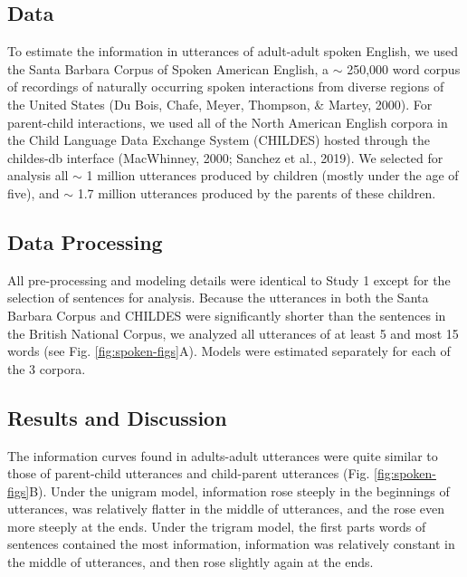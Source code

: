 \documentclass[man,floatsintext]{apa6}
\begin{document}
\hypertarget{data-1}{%
\subsection{Data}\label{data-1}}

To estimate the information in utterances of adult-adult spoken English, we used the Santa Barbara Corpus of Spoken American English, a \(\sim\) 250,000 word corpus of recordings of naturally occurring spoken interactions from diverse regions of the United States (Du Bois, Chafe, Meyer, Thompson, \& Martey, 2000). For parent-child interactions, we used all of the North American English corpora in the Child Language Data Exchange System (CHILDES) hosted through the childes-db interface (MacWhinney, 2000; Sanchez et al., 2019). We selected for analysis all \(\sim\) 1 million utterances produced by children (mostly under the age of five), and \(\sim\) 1.7 million utterances produced by the parents of these children.

\hypertarget{data-processing}{%
\subsection{Data Processing}\label{data-processing}}

All pre-processing and modeling details were identical to Study 1 except for the selection of sentences for analysis. Because the utterances in both the Santa Barbara Corpus and CHILDES were significantly shorter than the sentences in the British National Corpus, we analyzed all utterances of at least 5 and most 15 words (see Fig. \ref{fig:spoken-figs}A). Models were estimated separately for each of the 3 corpora.

\hypertarget{results-and-discussion-1}{%
\subsection{Results and Discussion}\label{results-and-discussion-1}}

The information curves found in adults-adult utterances were quite similar to those of parent-child utterances and child-parent utterances (Fig. \ref{fig:spoken-figs}B). Under the unigram model, information rose steeply in the beginnings of utterances, was relatively flatter in the middle of utterances, and the rose even more steeply at the ends. Under the trigram model, the first parts words of sentences contained the most information, information was relatively constant in the middle of utterances, and then rose slightly again at the ends.
\end{document}
